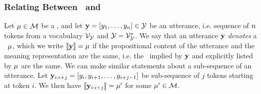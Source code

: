 


\subsubsection{Relating Between \MeaningRepresentations~and \Utterances}

Let $\mu \in \mathcal{M}$ be a \meaningrepresentation, and let $\mathbf{y} = \left[y_1,\ldots,
y_n \right] \in \mathcal{Y}$ be an utterance, i.e. sequence of $n$ tokens from a vocabulary 
$\mathcal{V}_{\mathcal{Y}}$ and $\mathcal{Y} = \mathcal{V}_{\mathcal{Y}}^*$. We say that an utterance $\mathbf{y}$ \textit{denotes} a \meaningrepresentation~$\mu$,
which we write $\left\llbracket \mathbf{y} \right\rrbracket = \mu$ if the propositional content of the utterance and the
meaning representation are the same, i.e. the \attributevalues~implied by $\mathbf{y}$ and explicitly 
listed by $\mu$ are the same. 
We can make similar statements about a sub-sequence of an utterance. Let 
$\mathbf{y}_{i:i+j} = \left[y_i, y_{i+1},\ldots, y_{i+j-1} \right]$ be 
sub-sequence of $j$ tokens starting at token $i$. 
We then have $\left\llbracket \mathbf{y}_{i:i+j} \right\rrbracket = \mu^\prime$ for some $\mu^\prime \in \mathcal{M}$.  


